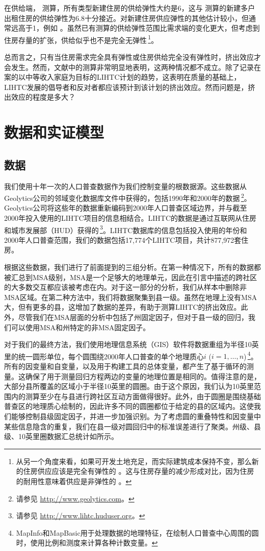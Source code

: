 \documentclass[lang=cn,11pt,a4paper]{paper}
\begin{document}
在供给端，\cite{Mayer200085} 测算，所有类型新建住房的供给弹性大约是6，这与 \cite{DiPasquale1992337} 测算的新建多户出租住房的供给弹性为6.8十分接近。对新建住房供应弹性的其他估计较小，但通常远高于1，例如 \citep{DiPasquale1992337,Rosen19791}。虽然已有测算的供给弹性范围比需求端的变化更大，但考虑到住房存量的扩张，供给似乎也不是完全无弹性\,\footnote{从另一个角度来看，如果可开发土地充足，而实际建筑成本保持不变，那么新的住房供应应该是完全有弹性的 \citep{Rosenthal1994182}。这与住房存量的减少形成对比，因为住房的耐用性意味着供应是非弹性的 \citep{Glaeser2005345}。}。

总而言之，只有当住房需求完全具有弹性或住房供给完全没有弹性时，挤出效应才会发生。然而，文献中的测算非常明显地表明，这两种情况都不成立。除了记录在案的以中等收入家庭为目标的LIHTC计划的趋势，这表明在质量的基础上，LIHTC发展的倡导者和反对者都应该预计到该计划的挤出效应。然而问题是，挤出效应的程度是多大？

\section{数据和实证模型}\label{sec4}

\subsection{数据}

我们使用十年一次的人口普查数据作为我们控制变量的根数据源。这些数据从Geolytics公司的邻域变化数据库文件中获得的，包括1990年和2000年的数据\,\footnote{请参见 \url{http://www.geolytics.com}。}。Geolytics公司将这些年的数据重新编码到2000年人口普查区域边界，并与截至2000年投入使用的LIHTC项目的信息相结合。LIHTC的数据是通过互联网从住房和城市发展部（HUD）获得的\,\footnote{请参见 \url{http://www.lihtc.huduser.org}。}。LIHTC数据库的信息包括投入使用的年份和2000年人口普查范围，我们的数据包括17,774个LIHTC项目，共计877,972套住房。

根据这些数据，我们进行了前面提到的三组分析。在第一种情况下，所有的数据都被汇总到MSA级别，MSA是一个足够大的地理单元，因此在引言中描述的跨社区的大多数交互都应该被考虑在内。对于这一部分的分析，我们从样本中删除非MSA区域。在第二种方法中，我们将数据聚集到县一级。虽然在地理上没有MSA大，但有更多的县，这增加了数据的差异，有助于测算LIHTC的挤出效应。此外，尽管我们在MSA层面的分析中包括了州固定因子，但对于县一级的回归，我们可以使用MSA和州特定的非MSA固定因子。

对于我们的最终方法，我们使用地理信息系统（GIS）软件将数据重组为半径10英里的统一圆形单位，每个圆围绕2000年人口普查的单个地理质心$i$ ($i = 1, \dots,n$)\,\footnote{MapInfo和MapBasic用于处理数据的地理特征，在绘制人口普查中心周围的圆时，使用比例和测度来计算各种计数变量。}。所有的因变量和自变量，以及用于构建工具的总体变量，都产生了基于循环的测量。这确保了用于测量回归方程两边的变量的地理位置是相同的。值得注意的是，大部分县所覆盖的区域小于半径10英里的圆圈。由于这个原因，我们认为10英里范围内的测算至少在与县进行跨社区互动方面做得很好。此外，由于圆圈是围绕基础普查区的地理质心绘制的，因此许多不同的圆圈都位于给定的县的区域内。这使我们能够控制县级固定因子，并进一步加强识别。为了考虑圆的重叠特性和因变量中某些信息隐含的重复，我们在县一级对圆回归中的标准误差进行了聚类。州级、县级、10英里圈数据汇总统计如所示。
\end{document}
